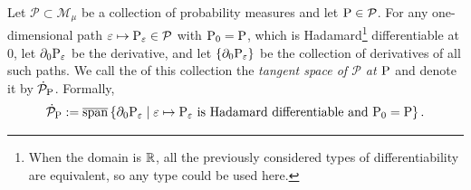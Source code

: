 \documentclass[a4,danish]{article}
\begin{document}

\begin{definition}
  Let $\mathcal{P} \subset \mathcal{M}_{\mu}$ be a collection of probability measures and let
  $\P \in \mathcal{P}$. For any one-dimensional path
  $\epsilon \mapsto \P_{\epsilon} \in \mathcal{P}$ with $\P_0 =\P$, which is Hadamard\footnote{When
    the domain is $\R$, all the previously considered types of differentiability are equivalent, so
    any type could be used here.} differentiable at 0, let $\partial_0\P_{\epsilon}$ be the
  derivative, and let $\{\partial_0\P_{\epsilon}\}$ be the collection of derivatives of all such paths. We call
  the  of this collection the \textit{tangent space of
    $\mathcal{P}$ at $\P$} and denote it by $\dot{\mathcal{P}}_{\P}$. Formally,
  \begin{equation*}
    \dot{\mathcal{P}}_{\P}
    := \overline{\mathrm{span}}
    \left\{ \partial_0\P_{\epsilon}
      \midd \epsilon \mapsto \P_{\epsilon} \text{ is Hadamard differentiable and } \P_0 = \P  \right\}.
  \end{equation*}
\end{definition}
\end{document}
